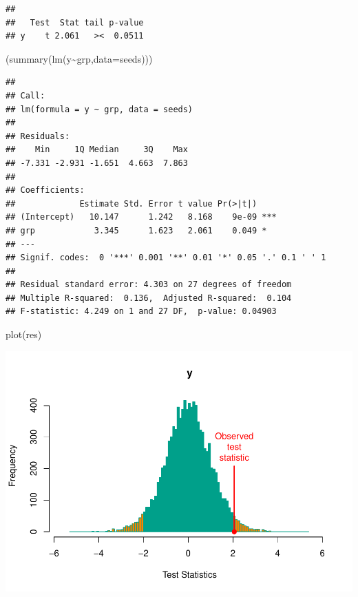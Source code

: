 \documentclass[
]{article}
\newenvironment{Shaded}{\begin{snugshade}}{\end{snugshade}}
\newcommand{\AttributeTok}[1]{\textcolor[rgb]{0.77,0.63,0.00}{#1}}
\newcommand{\FunctionTok}[1]{\textcolor[rgb]{0.00,0.00,0.00}{#1}}
\newcommand{\NormalTok}[1]{#1}
\newcommand{\SpecialCharTok}[1]{\textcolor[rgb]{0.00,0.00,0.00}{#1}}
\begin{document}
\begin{verbatim}
## 
##   Test  Stat tail p-value
## y    t 2.061   ><  0.0511
\end{verbatim}

\begin{Shaded}
\begin{Highlighting}[]
\NormalTok{(}\FunctionTok{summary}\NormalTok{(}\FunctionTok{lm}\NormalTok{(y}\SpecialCharTok{\textasciitilde{}}\NormalTok{grp,}\AttributeTok{data=}\NormalTok{seeds)))}
\end{Highlighting}
\end{Shaded}

\begin{verbatim}
## 
## Call:
## lm(formula = y ~ grp, data = seeds)
## 
## Residuals:
##    Min     1Q Median     3Q    Max 
## -7.331 -2.931 -1.651  4.663  7.863 
## 
## Coefficients:
##             Estimate Std. Error t value Pr(>|t|)    
## (Intercept)   10.147      1.242   8.168    9e-09 ***
## grp            3.345      1.623   2.061    0.049 *  
## ---
## Signif. codes:  0 '***' 0.001 '**' 0.01 '*' 0.05 '.' 0.1 ' ' 1
## 
## Residual standard error: 4.303 on 27 degrees of freedom
## Multiple R-squared:  0.136,  Adjusted R-squared:  0.104 
## F-statistic: 4.249 on 1 and 27 DF,  p-value: 0.04903
\end{verbatim}

\begin{Shaded}
\begin{Highlighting}[]
\FunctionTok{plot}\NormalTok{(res)}
\end{Highlighting}
\end{Shaded}

\begin{center}\includegraphics{perm_files/figure-latex/unnamed-chunk-24-1} \end{center}
\end{document}
